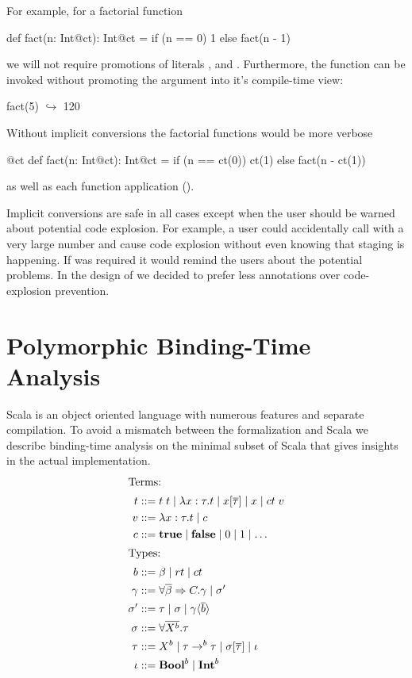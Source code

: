 For example, for a factorial function \begin{lstparagraph}
def fact(n: Int@ct): Int@ct =
  if (n == 0) 1 else fact(n - 1)
 \end{lstparagraph} we will not require promotions of literals , and . Furthermore,
 the function can be invoked without promoting the argument into it's compile-time view:\begin{lstparagraph}
fact(5)
  $\hookrightarrow$ 120
 \end{lstparagraph}

Without implicit conversions the factorial functions would be more verbose
\begin{lstparagraph} @ct def fact(n: Int@ct): Int@ct =   if (n == ct(0)) ct(1)
else fact(n - ct(1))  \end{lstparagraph} as well as each function application
().

Implicit conversions are safe in all cases except when the user should be warned about potential
code explosion. For example, a user could accidentally call  with a very large number and
cause code explosion without even knowing that staging is happening. If  was required
it would remind the users about the potential problems. In the design of \tool we decided to
prefer less annotations over code-explosion prevention.


\section{Polymorphic Binding-Time Analysis} \label{sct:bta}

Scala is an object oriented language with numerous features and separate compilation. To avoid a mismatch between
the formalization and Scala we describe binding-time analysis on the minimal subset of Scala that gives insights in the
actual implementation.
\newcommand{\alt}{\mid}
\newcommand{\ct}[1]{ct \; #1}
\begin{align*}
\shortintertext{Terms:}
t       &::= t\;t \alt \func{x: \tau}{t} \alt x[\overline{\tau}] \alt x \alt \ct{v} \\
v       &::= \func{x: \tau}{t} \alt c\\
c       &::= \ktrue \alt \kfalse \alt 0 \alt 1 \alt \dots\\
\shortintertext{Types:}
b       &::= \beta \alt  rt \alt  ct \\
\gamma  &::= \forall \overline{\beta} \Rightarrow C. \gamma \alt \sigma'\\
\sigma' &::= \tau \alt \sigma \alt \gamma\langle{\overline{b}}\rangle\\
\sigma  &::= \univ{\overline{X^b}}{\tau}\\
\tau    &::= X^b \alt \tau \rightarrow^b \tau \alt \sigma[\overline{\tau}]\alt \btyp\\
\btyp   &::= \kbool^b \alt \kint^b
\end{align*}

